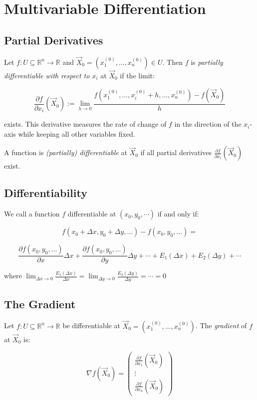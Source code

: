 \section{Multivariable Differentiation}

\subsection{Partial Derivatives}

Let \( f : U \subseteq \mathbb{R}^n \to \mathbb{R} \) and \( \vec{X}_0 = (x_1^{(0)}, \dots, x_n^{(0)}) \in U \). Then \( f \) is \emph{partially differentiable with respect to \( x_i \)} at \( \vec{X}_0 \) if the limit:

\[
\frac{\partial f}{\partial x_i}(\vec{X}_0) := \lim_{h \to 0} \frac{f(x_1^{(0)}, \dots, x_i^{(0)} + h, \dots, x_n^{(0)}) - f(\vec{X}_0)}{h}
\]

exists. This derivative measures the rate of change of \( f \) in the direction of the \( x_i \)-axis while keeping all other variables fixed.

A function is \emph{(partially) differentiable} at \( \vec{X}_0 \) if all partial derivatives \( \frac{\partial f}{\partial x_i}(\vec{X}_0) \) exist.

\subsection{Differentiability}
We call a function \(f\) differentiable at \((x_0, y_0, \cdots)\) if and only if:

\[
f(x_0 + \Delta x, y_0 + \Delta y, \dots) - f(x_0, y_0, \dots) = 
\]

\[
\frac{\partial f(x_0, y_0, \dots)}{\partial x} \Delta x + \frac{\partial f(x_0, y_0, \dots)}{\partial y} \Delta y + \cdots + E_1(\Delta x) + E_2(\Delta y) + \cdots
\]

where \(\lim_{\Delta x \to 0}\frac{E_1(\Delta x)}{\Delta x} = \lim_{\Delta y \to 0}\frac{E_2(\Delta y)}{\Delta y} = \cdots = 0\)

\subsection{The Gradient}

Let \( f : U \subseteq \mathbb{R}^n \to \mathbb{R} \) be differentiable at \( \vec{X}_0 = (x_1^{(0)}, \dots, x_n^{(0)}) \). The \emph{gradient} of \( f \) at \( \vec{X}_0 \) is:

\[
\nabla f(\vec{X}_0) = \begin{pmatrix}
\frac{\partial f}{\partial x_1}(\vec{X}_0) \\
\vdots \\
\frac{\partial f}{\partial x_n}(\vec{X}_0)
\end{pmatrix}
\]

